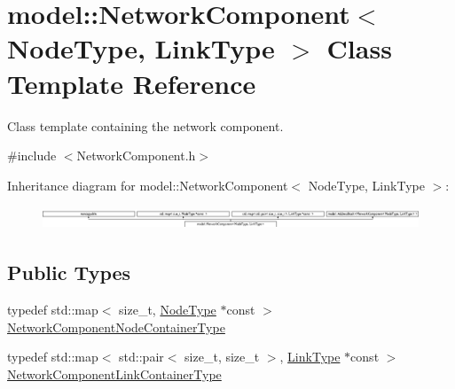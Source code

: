 \hypertarget{classmodel_1_1_network_component}{}\section{model\+:\+:Network\+Component$<$ Node\+Type, Link\+Type $>$ Class Template Reference}
\label{classmodel_1_1_network_component}


Class template containing the network component.  




{\ttfamily \#include $<$Network\+Component.\+h$>$}

Inheritance diagram for model\+:\+:Network\+Component$<$ Node\+Type, Link\+Type $>$\+:\begin{figure}[H]
\begin{center}
\leavevmode
\includegraphics[height=0.684597cm]{classmodel_1_1_network_component}
\end{center}
\end{figure}
\subsection*{Public Types}
\begin{DoxyCompactItemize}
\item 
typedef std\+::map$<$ size\+\_\+t, \hyperlink{_network_typedefs_8h_a723f680c66f6a92647827790bcbafce0}{Node\+Type} $\ast$const  $>$ \hyperlink{classmodel_1_1_network_component_a5cc5556926889ad7063ecddceb7b23fc}{Network\+Component\+Node\+Container\+Type}
\item 
typedef std\+::map$<$ std\+::pair$<$ size\+\_\+t, size\+\_\+t $>$, \hyperlink{_spline_node_base__corder0_8h_ab09ccc0af6ea9402dfef7b0eac55cff3}{Link\+Type} $\ast$const  $>$ \hyperlink{classmodel_1_1_network_component_aa1d6608e9d5d47df3af19dc5d16ab1c9}{Network\+Component\+Link\+Container\+Type}
\end{DoxyCompactItemize}
